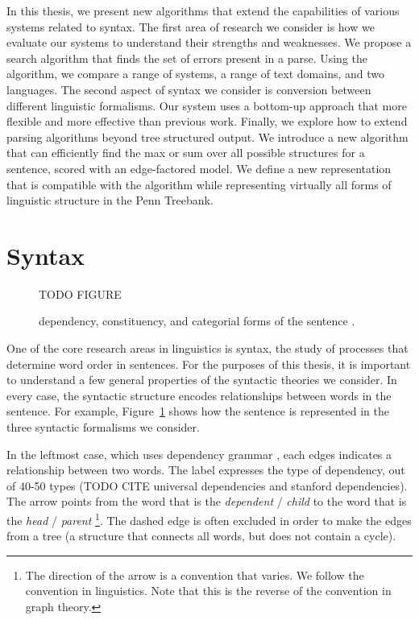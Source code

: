 In this thesis, we present new algorithms that extend the capabilities of various systems related to syntax.
The first area of research we consider is how we evaluate our systems to understand their strengths and weaknesses.
We propose a search algorithm that finds the set of errors present in a parse.
Using the algorithm, we compare a range of systems, a range of text domains, and two languages.
The second aspect of syntax we consider is conversion between different linguistic formalisms.
Our system uses a bottom-up approach that more flexible and more effective than previous work.
Finally, we explore how to extend parsing algorithms beyond tree structured output.
We introduce a new algorithm that can efficiently find the max or sum over all possible structures for a sentence, scored with an edge-factored model.
We define a new representation that is compatible with the algorithm while representing virtually all forms of linguistic structure in the Penn Treebank.

\section{Syntax}

\begin{figure}
  TODO FIGURE
  \caption{
  \label{fig:syntax}
  dependency, 
  constituency, 
  and categorial forms of the sentence .
  }
\end{figure}

One of the core research areas in linguistics is syntax, the study of processes that determine word order in sentences.
For the purposes of this thesis, it is important to understand a few general properties of the syntactic theories we consider.
In every case, the syntactic structure encodes relationships between words in the sentence.
For example, Figure~\ref{fig:syntax} shows how the sentence  is represented in the three syntactic formalisms we consider.

In the leftmost case, which uses dependency grammar \parencite{dependency-grammar}, each edges indicates a relationship between two words.
The label expresses the type of dependency, out of 40-50 types (TODO CITE universal dependencies and stanford dependencies).
The arrow points from the word that is the \textit{dependent} / \textit{child} to the word that is the \textit{head} / \textit{parent}
\footnote{The direction of the arrow is a convention that varies. We follow the convention in linguistics. Note that this is the reverse of the convention in graph theory.}.
The dashed edge is often excluded in order to make the edges from a tree (a structure that connects all words, but does not contain a cycle).

